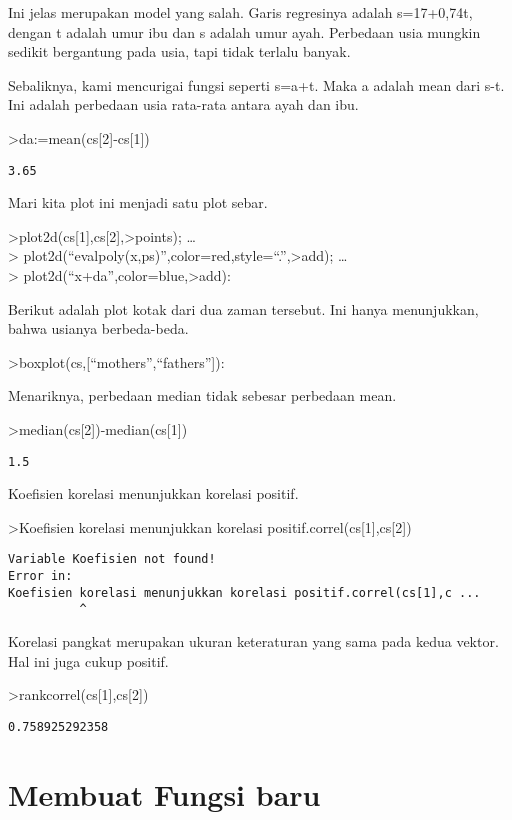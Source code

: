 \documentclass[
]{book}
\begin{document}
Ini jelas merupakan model yang salah. Garis regresinya adalah s=17+0,74t, dengan t adalah umur ibu dan s adalah umur ayah. Perbedaan usia mungkin sedikit bergantung pada usia, tapi tidak terlalu banyak.

Sebaliknya, kami mencurigai fungsi seperti s=a+t. Maka a adalah mean dari s-t. Ini adalah perbedaan usia rata-rata antara ayah dan ibu.

\textgreater da:=mean(cs{[}2{]}-cs{[}1{]})

\begin{verbatim}
3.65
\end{verbatim}

Mari kita plot ini menjadi satu plot sebar.

\textgreater plot2d(cs{[}1{]},cs{[}2{]},\textgreater points); \ldots{}\\
\textgreater{} plot2d(``evalpoly(x,ps)'',color=red,style=``.'',\textgreater add); \ldots{}\\
\textgreater{} plot2d(``x+da'',color=blue,\textgreater add):

Berikut adalah plot kotak dari dua zaman tersebut. Ini hanya menunjukkan, bahwa usianya berbeda-beda.

\textgreater boxplot(cs,{[}``mothers'',``fathers''{]}):

Menariknya, perbedaan median tidak sebesar perbedaan mean.

\textgreater median(cs{[}2{]})-median(cs{[}1{]})

\begin{verbatim}
1.5
\end{verbatim}

Koefisien korelasi menunjukkan korelasi positif.

\textgreater Koefisien korelasi menunjukkan korelasi positif.correl(cs{[}1{]},cs{[}2{]})

\begin{verbatim}
Variable Koefisien not found!
Error in:
Koefisien korelasi menunjukkan korelasi positif.correl(cs[1],c ...
          ^
\end{verbatim}

Korelasi pangkat merupakan ukuran keteraturan yang sama pada kedua vektor. Hal ini juga cukup positif.

\textgreater rankcorrel(cs{[}1{]},cs{[}2{]})

\begin{verbatim}
0.758925292358
\end{verbatim}

\chapter{Membuat Fungsi baru}\label{membuat-fungsi-baru}
\end{document}
